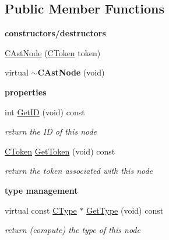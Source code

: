 \subsection*{Public Member Functions}
\begin{Indent}{\bf constructors/destructors}\par
\begin{DoxyCompactItemize}
\item 
\hyperlink{classCAstNode_aedf455a66b4f7d6561b6aebcd515a814}{C\-Ast\-Node} (\hyperlink{classCToken}{C\-Token} token)
\item 
\hypertarget{classCAstNode_a582d8fa4257bc4ba09d3e15f30d83c73}{virtual {\bfseries $\sim$\-C\-Ast\-Node} (void)}\label{classCAstNode_a582d8fa4257bc4ba09d3e15f30d83c73}

\end{DoxyCompactItemize}
\end{Indent}
\begin{Indent}{\bf properties}\par
\begin{DoxyCompactItemize}
\item 
\hypertarget{classCAstNode_a03e4cdb3e4038e914eb2888d2284f1d9}{int \hyperlink{classCAstNode_a03e4cdb3e4038e914eb2888d2284f1d9}{Get\-I\-D} (void) const }\label{classCAstNode_a03e4cdb3e4038e914eb2888d2284f1d9}

\begin{DoxyCompactList}\small\item\em return the I\-D of this node \end{DoxyCompactList}\item 
\hypertarget{classCAstNode_af3ac98d4ad3b2ece32eb6399e8a4612f}{\hyperlink{classCToken}{C\-Token} \hyperlink{classCAstNode_af3ac98d4ad3b2ece32eb6399e8a4612f}{Get\-Token} (void) const }\label{classCAstNode_af3ac98d4ad3b2ece32eb6399e8a4612f}

\begin{DoxyCompactList}\small\item\em return the token associated with this node \end{DoxyCompactList}\end{DoxyCompactItemize}
\end{Indent}
\begin{Indent}{\bf type management}\par
\begin{DoxyCompactItemize}
\item 
\hypertarget{classCAstNode_a338a1b15b0257ad5ef91c690b42fea3d}{virtual const \hyperlink{classCType}{C\-Type} $\ast$ \hyperlink{classCAstNode_a338a1b15b0257ad5ef91c690b42fea3d}{Get\-Type} (void) const }\label{classCAstNode_a338a1b15b0257ad5ef91c690b42fea3d}

\begin{DoxyCompactList}\small\item\em return (compute) the type of this node \end{DoxyCompactList}\end{DoxyCompactItemize}
\end{Indent}
